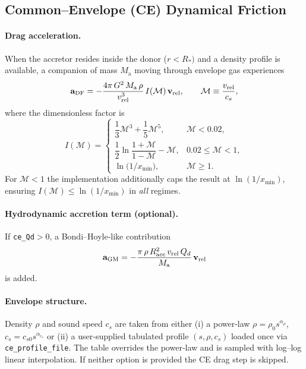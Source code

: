 \documentclass[11pt]{article}
\begin{document}
\subsection{Common–Envelope (CE) Dynamical Friction}
\label{sec:ce_drag}

\paragraph{Drag acceleration.}
When the accretor resides inside the donor ($r<R_*)$ and a density profile is
available, a companion of mass $M_{\mathrm a}$ moving through envelope gas
experiences
\[
\mathbf a_{\rm DF}=
-\frac{4\pi\,G^2\,M_{\mathrm a}\,\rho}{v_{\rm rel}^3}\,
   I(\mathcal M)\,\mathbf v_{\rm rel},
\qquad
\mathcal M\equiv\frac{v_{\rm rel}}{c_s},
\]
where the dimensionless factor is
\begin{equation}
I(\mathcal M)=
\begin{cases}
\dfrac{1}{3}\mathcal M^3+\dfrac{1}{5}\mathcal M^5,&\mathcal M<0.02,\\[0.6em]
\dfrac{1}{2}\ln\!\dfrac{1+\mathcal M}{1-\mathcal M}-\mathcal M,
 & 0.02\le\mathcal M<1,\\[0.6em]
\ln\!\bigl(1/x_{\min}\bigr),&\mathcal M\ge1.
\end{cases}
\label{eq:I_prefactor}
\end{equation}
For $\mathcal M<1$ the implementation additionally caps the result at
$\ln(1/x_{\min})$,
ensuring $I(\mathcal M)\le\ln(1/x_{\min})$ in \emph{all} regimes.

\paragraph{Hydrodynamic accretion term (optional).}
If \texttt{ce\_Qd}$>$0,
a Bondi–Hoyle‐like contribution
\[
\mathbf a_{\rm GM}
=-\frac{\pi\,\rho\,R_{\mathrm acc}^2\,v_{\rm rel}\,Q_d}{M_{\mathrm a}}
\,\mathbf v_{\rm rel}
\]
is added.

\paragraph{Envelope structure.}
Density $\rho$ and sound speed $c_s$ are taken from either
(i) a power‑law $\rho=\rho_0s^{\alpha_\rho}$, $c_s=c_{s0}s^{\alpha_{c_s}}$
or
(ii) a user‑supplied tabulated profile $(s,\rho,c_s)$ loaded once via
\texttt{ce\_profile\_file}.  The table overrides the power‑law and is sampled
with log–log linear interpolation.  If neither option is provided the CE drag
step is skipped.
\end{document}
